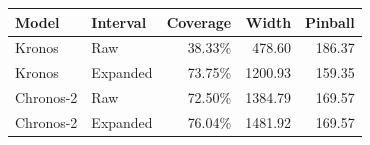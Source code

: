 \begin{tabular}{llrrr}
\toprule
Model & Interval & Coverage & Width & Pinball \\
\midrule
Kronos & Raw & 38.33\% & 478.60 & 186.37 \\
Kronos & Expanded & 73.75\% & 1200.93 & 159.35 \\
Chronos-2 & Raw & 72.50\% & 1384.79 & 169.57 \\
Chronos-2 & Expanded & 76.04\% & 1481.92 & 169.57 \\
\bottomrule
\end{tabular}
